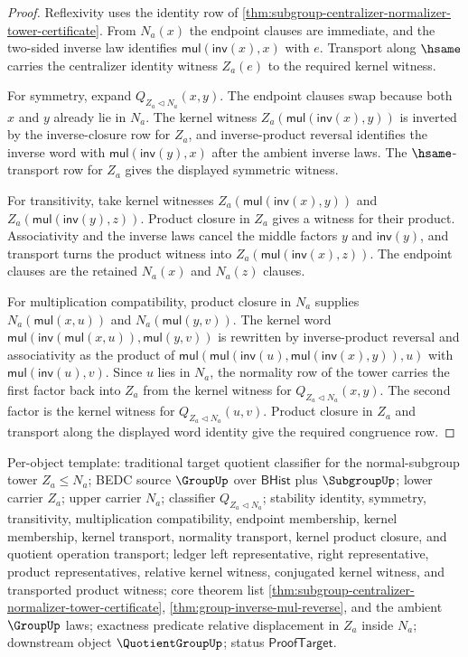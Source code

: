 \begin{proof}
Reflexivity uses the identity row of
\autoref{thm:subgroup-centralizer-normalizer-tower-certificate}. From
$N_a(x)$ the endpoint clauses are immediate, and the two-sided inverse law
identifies $\mathsf{mul}(\mathsf{inv}(x),x)$ with $e$. Transport along
$\hsame$ carries the centralizer identity witness $Z_a(e)$ to the required
kernel witness.

For symmetry, expand $Q_{Z_a\triangleleft N_a}(x,y)$. The endpoint clauses
swap because both $x$ and $y$ already lie in $N_a$. The kernel witness
$Z_a(\mathsf{mul}(\mathsf{inv}(x),y))$ is inverted by the inverse-closure row
for $Z_a$, and inverse-product reversal identifies the inverse word with
$\mathsf{mul}(\mathsf{inv}(y),x)$ after the ambient inverse laws. The
$\hsame$-transport row for $Z_a$ gives the displayed symmetric witness.

For transitivity, take kernel witnesses
$Z_a(\mathsf{mul}(\mathsf{inv}(x),y))$ and
$Z_a(\mathsf{mul}(\mathsf{inv}(y),z))$. Product closure in $Z_a$ gives a
witness for their product. Associativity and the inverse laws cancel the
middle factors $y$ and $\mathsf{inv}(y)$, and transport turns the product
witness into $Z_a(\mathsf{mul}(\mathsf{inv}(x),z))$. The endpoint clauses are
the retained $N_a(x)$ and $N_a(z)$ clauses.

For multiplication compatibility, product closure in $N_a$ supplies
$N_a(\mathsf{mul}(x,u))$ and $N_a(\mathsf{mul}(y,v))$. The kernel word
$\mathsf{mul}(\mathsf{inv}(\mathsf{mul}(x,u)),\mathsf{mul}(y,v))$ is rewritten
by inverse-product reversal and associativity as the product of
$\mathsf{mul}(\mathsf{mul}(\mathsf{inv}(u),
\mathsf{mul}(\mathsf{inv}(x),y)),u)$ with
$\mathsf{mul}(\mathsf{inv}(u),v)$. Since $u$ lies in $N_a$, the normality row
of the tower carries the first factor back into $Z_a$ from the kernel witness
for $Q_{Z_a\triangleleft N_a}(x,y)$. The second factor is the kernel witness
for $Q_{Z_a\triangleleft N_a}(u,v)$. Product closure in $Z_a$ and transport
along the displayed word identity give the required congruence row.
\end{proof}

Per-object template: traditional target quotient classifier for the
normal-subgroup tower $Z_a\leq N_a$; BEDC source $\GroupUp$ over
$\mathsf{BHist}$ plus $\SubgroupUp$; lower carrier $Z_a$; upper carrier
$N_a$; classifier $Q_{Z_a\triangleleft N_a}$; stability identity, symmetry,
transitivity, multiplication compatibility, endpoint membership, kernel
membership, kernel transport, normality transport, kernel product closure, and
quotient operation transport; ledger left representative, right
representative, product representatives, relative kernel witness, conjugated
kernel witness, and transported product witness; core theorem list
\autoref{thm:subgroup-centralizer-normalizer-tower-certificate},
\autoref{thm:group-inverse-mul-reverse}, and the ambient $\GroupUp$ laws;
exactness predicate relative displacement in $Z_a$ inside $N_a$; downstream
object $\QuotientGroupUp$; status $\mathsf{ProofTarget}$.
